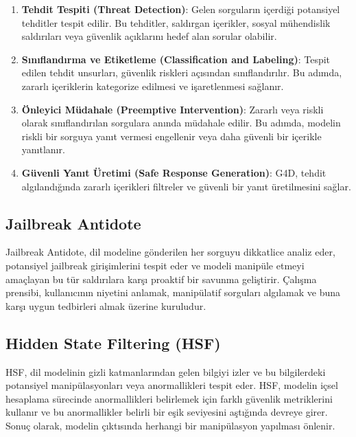 \begin{enumerate}
    \item \textbf{Tehdit Tespiti (Threat Detection)}: Gelen sorguların içerdiği potansiyel tehditler tespit edilir. Bu tehditler, saldırgan içerikler, sosyal mühendislik saldırıları veya güvenlik açıklarını hedef alan sorular olabilir.
    \item \textbf{Sınıflandırma ve Etiketleme (Classification and Labeling)}: Tespit edilen tehdit unsurları, güvenlik riskleri açısından sınıflandırılır. Bu adımda, zararlı içeriklerin kategorize edilmesi ve işaretlenmesi sağlanır.
    \item \textbf{Önleyici Müdahale (Preemptive Intervention)}: Zararlı veya riskli olarak sınıflandırılan sorgulara anında müdahale edilir. Bu adımda, modelin riskli bir sorguya yanıt vermesi engellenir veya daha güvenli bir içerikle yanıtlanır.
    \item \textbf{Güvenli Yanıt Üretimi (Safe Response Generation)}: G4D, tehdit algılandığında zararlı içerikleri filtreler ve güvenli bir yanıt üretilmesini sağlar.
\end{enumerate}

\newpage

\subsection{Jailbreak Antidote}

Jailbreak Antidote, dil modeline gönderilen her sorguyu dikkatlice analiz eder, potansiyel jailbreak girişimlerini tespit eder ve modeli manipüle etmeyi amaçlayan bu tür saldırılara karşı proaktif bir savunma geliştirir. Çalışma prensibi, kullanıcının niyetini anlamak, manipülatif sorguları algılamak ve buna karşı uygun tedbirleri almak üzerine kuruludur.

\newpage

\subsection{Hidden State Filtering (HSF)}

HSF, dil modelinin gizli katmanlarından gelen bilgiyi izler ve bu bilgilerdeki potansiyel manipülasyonları veya anormallikleri tespit eder. HSF, modelin içsel hesaplama sürecinde anormallikleri belirlemek için farklı güvenlik metriklerini kullanır ve bu anormallikler belirli bir eşik seviyesini aştığında devreye girer. Sonuç olarak, modelin çıktısında herhangi bir manipülasyon yapılması önlenir.

